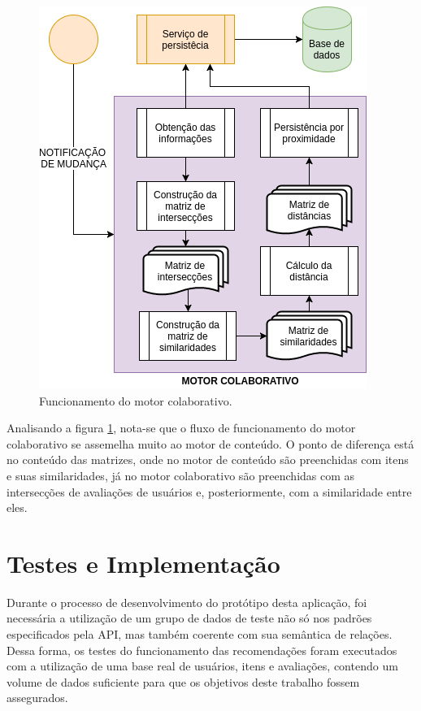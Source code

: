\begin{figure}[h!tp]
	\caption{\label{collaborative_engine}Funcionamento do motor colaborativo.}
	\begin{center}
		\includegraphics[scale=0.8]{images/collaborative_engine.png}
	\end{center}
	\hspace{5.5cm}{Fonte: O Autor.}
\end{figure}

Analisando a figura \ref{collaborative_engine}, nota-se que o fluxo de funcionamento do motor colaborativo se assemelha muito ao motor de conteúdo. O ponto de diferença está no conteúdo das matrizes, onde no motor de conteúdo são preenchidas com itens e suas similaridades, já no motor colaborativo são preenchidas com as intersecções de avaliações de usuários e, posteriormente, com a similaridade entre eles.

\section{Testes e Implementação} \label{testes}

Durante o processo de desenvolvimento do protótipo desta aplicação, foi necessária a utilização de um grupo de dados de teste não só nos padrões especificados pela API, mas também coerente com sua semântica de relações. Dessa forma, os testes do funcionamento das recomendações foram executados com a utilização de uma base real de usuários, itens e avaliações, contendo um volume de dados suficiente para que os objetivos deste trabalho fossem assegurados.

